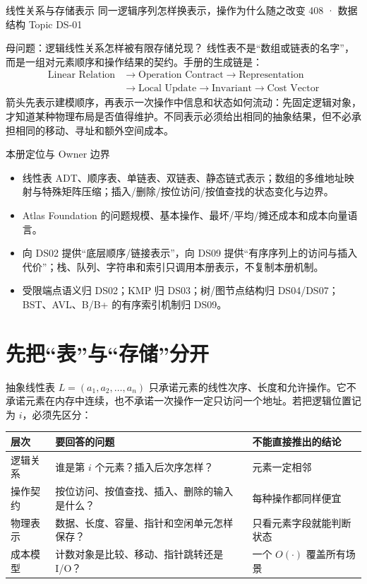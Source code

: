 \documentclass[UTF8,fontset=none,11pt,a4paper]{ctexart}
\begin{document}
\handbooktitle
  {线性关系与存储表示}
  {同一逻辑序列怎样换表示，操作为什么随之改变}
  {408 · 数据结构 Topic DS-01}

\begin{corebox}{母问题：逻辑线性关系怎样被有限存储兑现？}
线性表不是“数组或链表的名字”，而是一组对元素顺序和操作结果的契约。手册的生成链是：
\[
\begin{aligned}
\text{Linear Relation}&\to\text{Operation Contract}\to\text{Representation}\\
&\to\text{Local Update}\to\text{Invariant}\to\text{Cost Vector}
\end{aligned}
\]
箭头先表示建模顺序，再表示一次操作中信息和状态如何流动：先固定逻辑对象，才知道某种物理布局是否值得维护。不同表示必须给出相同的抽象结果，但不必承担相同的移动、寻址和额外空间成本。
\end{corebox}

\begin{methodbox}{本册定位与 Owner 边界}
\begin{itemize}
\item {}线性表 ADT、顺序表、单链表、双链表、静态链式表示；数组的多维地址映射与特殊矩阵压缩；插入/删除/按位访问/按值查找的状态变化与边界。
\item {}Atlas Foundation 的问题规模、基本操作、最坏/平均/摊还成本和成本向量语言。
\item {}向 DS02 提供“底层顺序/链接表示”，向 DS09 提供“有序序列上的访问与插入代价”；栈、队列、字符串和索引只调用本册表示，不复制本册机制。
\item {}受限端点语义归 DS02；KMP 归 DS03；树/图节点结构归 DS04/DS07；BST、AVL、B/B+ 的有序索引机制归 DS09。
\end{itemize}
\end{methodbox}

\tableofcontents\newpage

\section{先把“表”与“存储”分开}
抽象线性表 $L=(a_1,a_2,\ldots,a_n)$ 只承诺元素的线性次序、长度和允许操作。它不承诺元素在内存中连续，也不承诺一次操作一定只访问一个地址。若把逻辑位置记为 $i$，必须先区分：
\begin{center}\small
\begin{tabularx}{\linewidth}{L{2.1cm}YY}
\toprule
层次 & 要回答的问题 & 不能直接推出的结论\\
\midrule
逻辑关系 & 谁是第 $i$ 个元素？插入后次序怎样？ & 元素一定相邻\\
操作契约 & 按位访问、按值查找、插入、删除的输入是什么？ & 每种操作都同样便宜\\
物理表示 & 数据、长度、容量、指针和空闲单元怎样保存？ & 只看元素字段就能判断状态\\
成本模型 & 计数对象是比较、移动、指针跳转还是 I/O？ & 一个 $O(\cdot)$ 覆盖所有场景\\
\bottomrule
\end{tabularx}\end{center}
\end{document}
